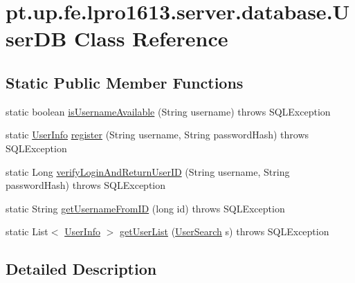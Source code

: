 \hypertarget{classpt_1_1up_1_1fe_1_1lpro1613_1_1server_1_1database_1_1_user_d_b}{}\section{pt.\+up.\+fe.\+lpro1613.\+server.\+database.\+User\+DB Class Reference}
\label{classpt_1_1up_1_1fe_1_1lpro1613_1_1server_1_1database_1_1_user_d_b}
\subsection*{Static Public Member Functions}
\begin{DoxyCompactItemize}
\item 
static boolean \hyperlink{classpt_1_1up_1_1fe_1_1lpro1613_1_1server_1_1database_1_1_user_d_b_ab6501b54b7768d7d854a68dd9ed1b830}{is\+Username\+Available} (String username)  throws S\+Q\+L\+Exception 
\item 
static \hyperlink{classpt_1_1up_1_1fe_1_1lpro1613_1_1sharedlib_1_1tuples_1_1_user_info}{User\+Info} \hyperlink{classpt_1_1up_1_1fe_1_1lpro1613_1_1server_1_1database_1_1_user_d_b_a1bcefeca4058dd57c0d2c0a7387af2e1}{register} (String username, String password\+Hash)  throws S\+Q\+L\+Exception 
\item 
static Long \hyperlink{classpt_1_1up_1_1fe_1_1lpro1613_1_1server_1_1database_1_1_user_d_b_ac3083ed924599ce2b694ce622676bca6}{verify\+Login\+And\+Return\+User\+ID} (String username, String password\+Hash)  throws S\+Q\+L\+Exception 
\item 
static String \hyperlink{classpt_1_1up_1_1fe_1_1lpro1613_1_1server_1_1database_1_1_user_d_b_ab5c986eb5c2ba36eef3defee599c6903}{get\+Username\+From\+ID} (long id)  throws S\+Q\+L\+Exception 
\item 
static List$<$ \hyperlink{classpt_1_1up_1_1fe_1_1lpro1613_1_1sharedlib_1_1tuples_1_1_user_info}{User\+Info} $>$ \hyperlink{classpt_1_1up_1_1fe_1_1lpro1613_1_1server_1_1database_1_1_user_d_b_a954a448685644afc277007bdf36bb507}{get\+User\+List} (\hyperlink{classpt_1_1up_1_1fe_1_1lpro1613_1_1sharedlib_1_1tuples_1_1_user_search}{User\+Search} s)  throws S\+Q\+L\+Exception 
\end{DoxyCompactItemize}


\subsection{Detailed Description}


